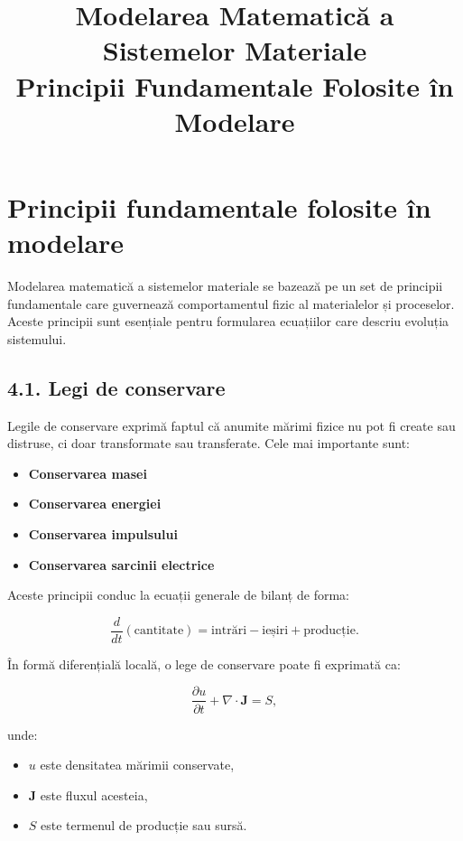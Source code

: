\documentclass[12pt,a4paper]{article}
\title{Modelarea Matematică a Sistemelor Materiale \\ \large Principii Fundamentale Folosite în Modelare}
\author{}
\date{}
\begin{document}
\maketitle

\section{Principii fundamentale folosite în modelare}

Modelarea matematică a sistemelor materiale se bazează pe un set de principii fundamentale care guvernează comportamentul fizic al materialelor și proceselor. Aceste principii sunt esențiale pentru formularea ecuațiilor care descriu evoluția sistemului.

\subsection{4.1. Legi de conservare}

Legile de conservare exprimă faptul că anumite mărimi fizice nu pot fi create sau distruse, ci doar transformate sau transferate. Cele mai importante sunt:

\begin{itemize}
    \item \textbf{Conservarea masei}
    \item \textbf{Conservarea energiei}
    \item \textbf{Conservarea impulsului}
    \item \textbf{Conservarea sarcinii electrice}
\end{itemize}

Aceste principii conduc la ecuații generale de bilanț de forma:


\[
\frac{d}{dt}(\text{cantitate}) = \text{intrări} - \text{ieșiri} + \text{producție}.
\]



În formă diferențială locală, o lege de conservare poate fi exprimată ca:


\[
\frac{\partial u}{\partial t} + \nabla \cdot \mathbf{J} = S,
\]


unde:
\begin{itemize}
    \item $u$ este densitatea mărimii conservate,
    \item $\mathbf{J}$ este fluxul acesteia,
    \item $S$ este termenul de producție sau sursă.
\end{itemize}
\end{document}
